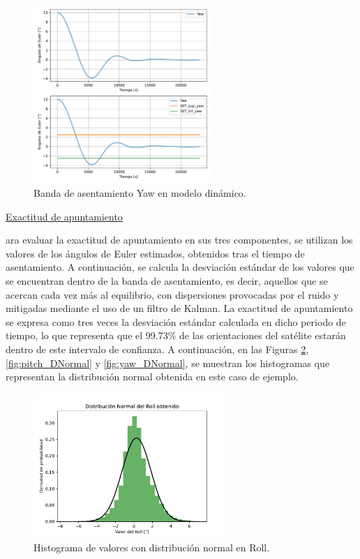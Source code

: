 \begin{figure}[H]
	\centering    
	\includegraphics[width=0.6\textwidth]{time_yaw.pdf}
	\caption{Banda de asentamiento Yaw en modelo dinámico.}
	\label{fig:time_yaw}
\end{figure}	

\underline{Exactitud de apuntamiento}

ara evaluar la exactitud de apuntamiento en sus tres componentes, se utilizan los valores de los ángulos de Euler estimados, obtenidos tras el tiempo de asentamiento. A continuación, se calcula la desviación estándar de los valores que se encuentran dentro de la banda de asentamiento, es decir, aquellos que se acercan cada vez más al equilibrio, con dispersiones provocadas por el ruido y mitigadas mediante el uso de un filtro de Kalman. La exactitud de apuntamiento se expresa como tres veces la desviación estándar calculada en dicho periodo de tiempo, lo que representa que el 99.73\% de las orientaciones del satélite estarán dentro de este intervalo de confianza. A continuación, en las Figuras \ref{fig:roll_DNormal}, \ref{fig:pitch_DNormal} y \ref{fig:yaw_DNormal}, se muestran los histogramas que representan la distribución normal obtenida en este caso de ejemplo.


\begin{figure}[H]
	\centering    
	\includegraphics[width=0.65\textwidth]{roll_DNormal.pdf}
	\caption{Histograma de valores con distribución normal en Roll.}
	\label{fig:roll_DNormal}
\end{figure}	

